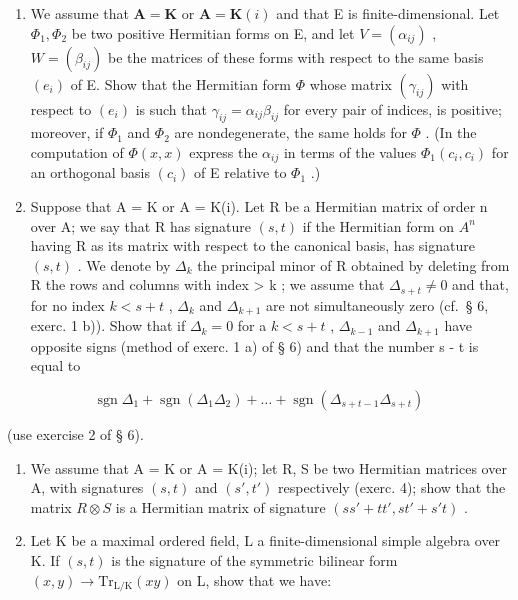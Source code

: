 \begin{enumerate}
\def\labelenumi{\arabic{enumi})}
\setcounter{enumi}{2}
\item
  We assume that \(\mathbf{A} = \mathbf{K}\) or \(\mathbf{A} = \mathbf{K}(i)\) and that E is finite-dimensional. Let \(\Phi_1, \Phi_2\) be two positive Hermitian forms on E, and let \(V = (\alpha_{ij})\) , \(W = (\beta_{ij})\) be the matrices of these forms with respect to the same basis \((e_i)\) of E. Show that the Hermitian form \(\Phi\) whose matrix \((\gamma_{ij})\) with respect to \((e_i)\) is such that \(\gamma_{ij} = \alpha_{ij}\beta_{ij}\) for every pair of indices, is positive; moreover, if \(\Phi_1\) and \(\Phi_2\) are nondegenerate, the same holds for \(\Phi\) . (In the computation of \(\Phi(x, x)\) express the \(\alpha_{ij}\) in terms of the values \(\Phi_1(c_i, c_i)\) for an orthogonal basis \((c_i)\) of E relative to \(\Phi_1\) .)
\item
  Suppose that A = K or A = K(i). Let R be a Hermitian matrix of order n over A; we say that R has signature \((s, t)\) if the Hermitian form on \(A^{n}\) having R as its matrix with respect to the canonical basis, has signature \((s, t)\) . We denote by \(\Delta_{k}\) the principal minor of R obtained by deleting from R the rows and columns with index \textgreater{} k ; we assume that \(\Delta_{s+t} \neq 0\) and that, for no index \(k < s + t\) , \(\Delta_{k}\) and \(\Delta_{k+1}\) are not simultaneously zero (cf.~§ 6, exerc. 1 b)). Show that if \(\Delta_{k} = 0\) for a \(k < s + t\) , \(\Delta_{k-1}\) and \(\Delta_{k+1}\) have opposite signs (method of exerc. 1 a) of § 6) and that the number s - t is equal to
\end{enumerate}

\[
\operatorname{sgn} \Delta_ {1} + \operatorname{sgn} \left(\Delta_ {1} \Delta_ {2}\right) + \dots + \operatorname{sgn} \left(\Delta_ {s + t - 1} \Delta_ {s + t}\right)
\]

(use exercise 2 of § 6).

\begin{enumerate}
\def\labelenumi{\arabic{enumi})}
\setcounter{enumi}{4}
\item
  We assume that A = K or A = K(i); let R, S be two Hermitian matrices over A, with signatures \((s, t)\) and \((s', t')\) respectively (exerc. 4); show that the matrix \(R \otimes S\) is a Hermitian matrix of signature \((ss' + tt', st' + s't)\) .
\item
  Let K be a maximal ordered field, L a finite-dimensional simple algebra over K. If \((s, t)\) is the signature of the symmetric bilinear form \((x, y) \to \mathrm{Tr}_{\mathrm{L/K}}(xy)\) on L, show that we have:
\end{enumerate}


